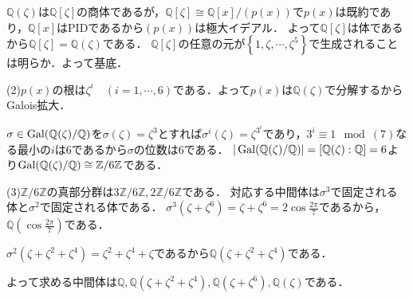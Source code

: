 \documentclass[
		book,
		head_space=20mm,
		foot_space=20mm,
		gutter=10mm,
		line_length=190mm
]{jlreq}
\begin{document}
$\mathbb{Q}(\zeta)$は$\mathbb{Q}[\zeta]$の商体であるが，$\mathbb{Q}[\zeta]\cong \mathbb{Q}[x]/(p(x))$で$p(x)$は既約であり，$\mathbb{Q}[x]$はPIDであるから$(p(x))$は極大イデアル．
よって$\mathbb{Q}[\zeta]$は体であるから$\mathbb{Q}[\zeta]=\mathbb{Q}(\zeta)$である．
$\mathbb{Q}[\zeta]$の任意の元が$\left\{ 1,\zeta,\cdots,\zeta^{5} \right\}$で生成されることは明らか．よって基底．

(2)$p(x)$の根は$\zeta^i\quad(i=1,\cdots,6)$である．よって$p(x)$は$\mathbb{Q}(\zeta)$で分解するからGalois拡大．

$\sigma\in \mathop{\mathrm{Gal}}(\mathbb{Q}(\zeta)/\mathbb{Q})$を$\sigma(\zeta)=\zeta^3$とすれば$\sigma^i(\zeta)=\zeta^{3^i}$であり，$3^i\equiv 1\mod(7)$なる最小の$i$は$6$であるから$\sigma$の位数は$6$である．
$|\mathop{\mathrm{Gal}}(\mathbb{Q}(\zeta)/\mathbb{Q})|=[\mathbb{Q}(\zeta):\mathbb{Q}]=6$より$\mathop{\mathrm{Gal}}(\mathbb{Q}(\zeta)/\mathbb{Q})\cong \mathbb{Z}/6 \mathbb{Z}$である．

(3)$\mathbb{Z}/6 \mathbb{Z}$の真部分群は$3 \mathbb{Z}/6 \mathbb{Z},2 \mathbb{Z}/ 6 \mathbb{Z}$である．
対応する中間体は$\sigma^3$で固定される体と$\sigma^2$で固定される体である．
$\sigma^3(\zeta+\zeta^6)=\zeta+\zeta^6=2\cos \frac{2\pi}{7}$であるから，$\mathbb{Q}(\cos \frac{2\pi}{7})$である．

$\sigma^2(\zeta+\zeta^2+\zeta^4)=\zeta^2+\zeta^4+\zeta$であるから$\mathbb{Q}(\zeta+\zeta^2+\zeta^4)$である．

よって求める中間体は$\mathbb{Q},\mathbb{Q}(\zeta+\zeta^2+\zeta^4),\mathbb{Q}(\zeta+\zeta^6),\mathbb{Q}(\zeta)$である．
\end{document}
